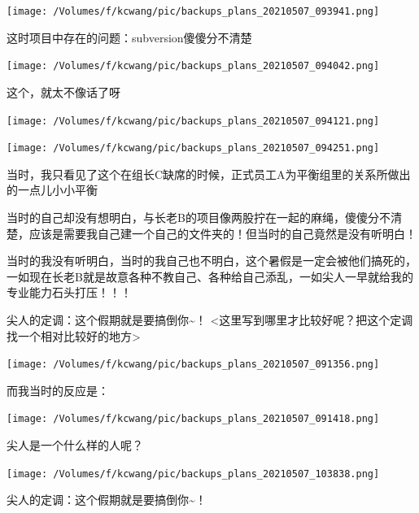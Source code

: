 \documentclass[9pt, b5paper]{article}
\begin{document}
\begin{center}
\texttt{[image: /Volumes/f/kcwang/pic/backups\_plans\_20210507\_093941.png]}
\end{center}

这时项目中存在的问题：subversion傻傻分不清楚

\begin{center}
\texttt{[image: /Volumes/f/kcwang/pic/backups\_plans\_20210507\_094042.png]}
\end{center}

这个，就太不像话了呀

\begin{center}
\texttt{[image: /Volumes/f/kcwang/pic/backups\_plans\_20210507\_094121.png]}
\end{center}

\begin{center}
\texttt{[image: /Volumes/f/kcwang/pic/backups\_plans\_20210507\_094251.png]}
\end{center}

当时，我只看见了这个在组长C缺席的时候，正式员工A为平衡组里的关系所做出的一点儿小小平衡

当时的自己却没有想明白，与长老B的项目像两股拧在一起的麻绳，傻傻分不清楚，应该是需要我自己建一个自己的文件夹的！但当时的自己竟然是没有听明白！

当时的我没有听明白，当时的我自己也不明白，这个暑假是一定会被他们搞死的，一如现在长老B就是故意各种不教自己、各种给自己添乱，一如尖人一早就给我的专业能力石头打压！！！

尖人的定调：这个假期就是要搞倒你\textasciitilde{}！ <这里写到哪里才比较好呢？把这个定调找一个相对比较好的地方>

\begin{center}
\texttt{[image: /Volumes/f/kcwang/pic/backups\_plans\_20210507\_091356.png]}
\end{center}

而我当时的反应是： 

\begin{center}
\texttt{[image: /Volumes/f/kcwang/pic/backups\_plans\_20210507\_091418.png]}
\end{center}

尖人是一个什么样的人呢？

\begin{center}
\texttt{[image: /Volumes/f/kcwang/pic/backups\_plans\_20210507\_103838.png]}
\end{center}

尖人的定调：这个假期就是要搞倒你\textasciitilde{}！
\end{document}
